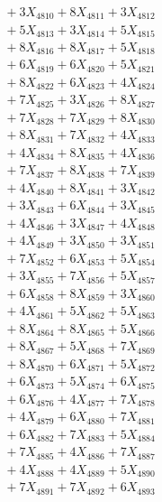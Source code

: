 \documentclass[a4paper,10pt]{article}
\begin{document}
{\begin{align}
&\;  + 3 X_{4810} + 8 X_{4811} + 3 X_{4812} \\[0.3ex]
&\;  + 5 X_{4813} + 3 X_{4814} + 5 X_{4815} \\[0.3ex]
&\;  + 8 X_{4816} + 8 X_{4817} + 5 X_{4818} \\[0.3ex]
&\;  + 6 X_{4819} + 6 X_{4820} + 5 X_{4821} \\[0.3ex]
&\;  + 8 X_{4822} + 6 X_{4823} + 4 X_{4824} \\[0.3ex]
&\;  + 7 X_{4825} + 3 X_{4826} + 8 X_{4827} \\[0.3ex]
&\;  + 7 X_{4828} + 7 X_{4829} + 8 X_{4830} \\[0.3ex]
&\;  + 8 X_{4831} + 7 X_{4832} + 4 X_{4833} \\[0.3ex]
&\;  + 4 X_{4834} + 8 X_{4835} + 4 X_{4836} \\[0.3ex]
&\;  + 7 X_{4837} + 8 X_{4838} + 7 X_{4839} \\[0.5ex]\allowbreak
&\;  + 4 X_{4840} + 8 X_{4841} + 3 X_{4842} \\[0.3ex]
&\;  + 3 X_{4843} + 6 X_{4844} + 3 X_{4845} \\[0.3ex]
&\;  + 4 X_{4846} + 3 X_{4847} + 4 X_{4848} \\[0.3ex]
&\;  + 4 X_{4849} + 3 X_{4850} + 3 X_{4851} \\[0.3ex]
&\;  + 7 X_{4852} + 6 X_{4853} + 5 X_{4854} \\[0.3ex]
&\;  + 3 X_{4855} + 7 X_{4856} + 5 X_{4857} \\[0.3ex]
&\;  + 6 X_{4858} + 8 X_{4859} + 3 X_{4860} \\[0.3ex]
&\;  + 4 X_{4861} + 5 X_{4862} + 5 X_{4863} \\[0.3ex]
&\;  + 8 X_{4864} + 8 X_{4865} + 5 X_{4866} \\[0.3ex]
&\;  + 8 X_{4867} + 5 X_{4868} + 7 X_{4869} \\[0.5ex]\allowbreak
&\;  + 8 X_{4870} + 6 X_{4871} + 5 X_{4872} \\[0.3ex]
&\;  + 6 X_{4873} + 5 X_{4874} + 6 X_{4875} \\[0.3ex]
&\;  + 6 X_{4876} + 4 X_{4877} + 7 X_{4878} \\[0.3ex]
&\;  + 4 X_{4879} + 6 X_{4880} + 7 X_{4881} \\[0.3ex]
&\;  + 6 X_{4882} + 7 X_{4883} + 5 X_{4884} \\[0.3ex]
&\;  + 7 X_{4885} + 4 X_{4886} + 7 X_{4887} \\[0.3ex]
&\;  + 4 X_{4888} + 4 X_{4889} + 5 X_{4890} \\[0.3ex]
&\;  + 7 X_{4891} + 7 X_{4892} + 6 X_{4893} \\[0.3ex]

\end{align}}
\end{document}
